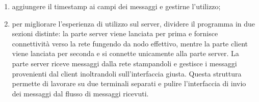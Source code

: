 \documentclass[10pt]{article} %
\begin{document}
\begin{enumerate}
	\item aggiungere il timestamp ai campi dei messaggi e gestirne l'utilizzo;
	\item per migliorare l'esperienza di utilizzo sul server, dividere il programma in due sezioni distinte: la parte server viene lanciata per prima e fornisce connettività verso la rete fungendo da nodo effettivo, mentre la parte client viene lanciata per seconda e si connette unicamente alla parte server. La parte server riceve messaggi dalla rete stampandoli e gestisce i messaggi provenienti dal client inoltrandoli sull'interfaccia giusta. Questa struttura permette di lavorare su due terminali separati e pulire l'interfaccia di invio dei messaggi dal flusso di messaggi ricevuti.
\end{enumerate}
\end{document}

